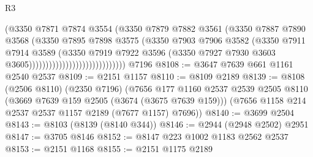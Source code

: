 \begin{lexlean}{R3}
\begin{coremodule}
                                              (@3350
                                                @7871
                                                @7874
                                                @3554
                                                (@3350
                                                  @7879
                                                  @7882
                                                  @3561
                                                  (@3350
                                                    @7887
                                                    @7890
                                                    @3568
                                                    (@3350
                                                      @7895
                                                      @7898
                                                      @3575
                                                      (@3350
                                                        @7903
                                                        @7906
                                                        @3582
                                                        (@3350
                                                          @7911
                                                          @7914
                                                          @3589
                                                          (@3350
                                                            @7919
                                                            @7922
                                                            @3596
                                                            (@3350
                                                              @7927
                                                              @7930
                                                              @3603
                                                              @3605)))))))))))))))))))))))))))))
    @7196
@8108 := @3647 @7639 @661 @1161 @2540 @2537
@8109 := @2151 @1157
@8110 := @8109 @2189
@8139 := @8108
    (@2506 @8110)
    (@2350 @7196)
    (@7656
      @177
      @1160
      @2537
      @2539
      @2505
      @8110
      (@3669 @7639 @159 @2505 (@3674 (@3675 @7639 @159)))
      (@7656 @1158 @214 @2537 @2537 @1157 @2189 (@7677 @1157) @7696))
@8140 := @3699 @2504
@8143 := @8103 (@8139 (@8140 @344))
@8146 := @2944 (@2948 @2502) @2951
@8147 := @3705 @8146
@8152 := @8147 @223 @1002 @1183 @2562 @2537
@8153 := @2151 @1168
@8155 := @2151 @1175 @2189

\end{coremodule}
\end{lexlean}
